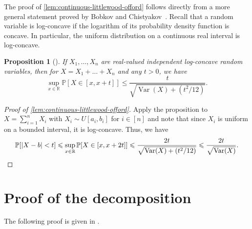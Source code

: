 \documentclass[reqno]{amsart}
\newtheorem{prop}[theorem]{Proposition}
\theoremstyle{remark}
\theoremstyle{definition}
\numberwithin{theorem}{section}
\renewcommand{\(}{\bigl(}
\renewcommand{\)}{\bigr)\vphantom{)}}
\newcommand{\Var}{\operatorname{Var}}
\renewcommand{\le}{\leqslant}
\renewcommand{\P}{\mathbb{P}}
\newcommand{\R}{\mathbb R}
\newcommand{\var}{\textup{Var}}
\begin{document}
The proof of \cref{lem:continuous-littlewood-offord} follows directly from a more general statement proved by Bobkov and Chistyakov~\cite{BobkovChistyakov2015-ConcentrationFunctions}. Recall that a random variable is log-concave if the logarithm of its probability density function is concave. In particular, the uniform distribution on a continuous real interval is log-concave.

\begin{prop}[\cite{BobkovChistyakov2015-ConcentrationFunctions}]\label{prop:log-concave-anticoncentration}
    If $X_1,\dots, X_n$ are real-valued independent log-concave random variables, then for $X = X_1 + \dots + X_n$ and any $t > 0$, we have
    \[\sup_{x\in \R}\P[X\in [x, x+t]] \le \frac{t}{\sqrt{\Var(X)+(t^2/12)}}.\]
\end{prop}

\begin{proof}[Proof of \cref{lem:continuous-littlewood-offord}]
    Apply the proposition to $X = \sum_{i = 1}^n X_i$ with $X_i \sim U[a_i, b_i]$ for $i\in [n]$ and note that since $X_i$ is uniform on a bounded interval, it is log-concave. Thus, we have
    \[\P[|X - b| < t]\le \sup_{x\in \R}\P[X\in [x,x+2t]]\le \frac{2t}{\sqrt{\Var(X)+(t^2/12)}}\le \frac{2t}{\sqrt{\var(X)}}.\qedhere\]
\end{proof}


\section{Proof of the decomposition}\label{app:decomp}

The following proof is given in \cite{yehuda2021slicing}.
\end{document}
